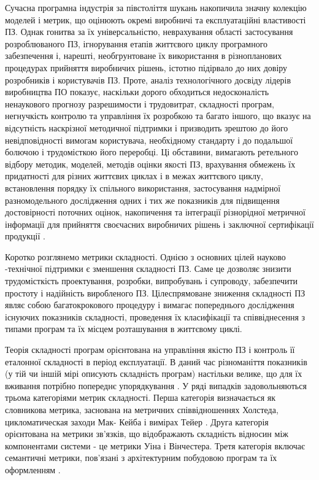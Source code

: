 Сучасна програмна індустрія за півстоліття шукань накопичила значну колекцію моделей і метрик, що оцінюють окремі виробничі та експлуатаційні властивості ПЗ. Однак гонитва за їх універсальністю, неврахування області застосування розроблюваного ПЗ, ігнорування етапів життєвого циклу програмного забезпечення і, нарешті, необгрунтоване їх використання в різнопланових процедурах прийняття виробничих рішень, істотно підірвало до них довіру розробників і користувачів ПЗ.
Проте, аналіз технологічного досвіду лідерів виробництва ПО показує, наскільки дорого обходиться недосконалість ненаукового прогнозу разрешимости і трудовитрат, складності програм, негнучкість контролю та управління їх розробкою та багато іншого, що вказує на відсутність наскрізної методичної підтримки і призводить зрештою до його невідповідності вимогам користувача, необхідному стандарту і до подальшої болючою і трудомісткою його переробці. Ці обставини, вимагають ретельного відбору методик, моделей, методів оцінки якості ПЗ, врахування обмежень їх придатності для різних життєвих циклах і в межах життєвого циклу, встановлення порядку їх спільного використання, застосування надмірної разномодельного дослідження одних і тих же показників для підвищення достовірності поточних оцінок, накопичення та інтеграції різнорідної метричної інформації для прийняття своєчасних виробничих рішень і заключної сертифікації продукції .

Коротко розглянемо метрики складності. Однією з основних цілей науково -технічної підтримки є зменшення складності ПЗ. Саме це дозволяє знизити трудомісткість проектування, розробки, випробувань і супроводу, забезпечити простоту і надійність виробленого ПЗ. Цілеспрямоване зниження складності ПЗ являє собою багатокрокового процедуру і вимагає попереднього дослідження існуючих показників складності, проведення їх класифікації та співвіднесення з типами програм та їх місцем розташування в життєвому циклі.

Теорія складності програм орієнтована на управління якістю ПЗ і контроль її еталонної складності в період експлуатації. В даний час різноманіття показників (у тій чи іншій мірі описують складність програм) настільки велике, що для їх вживання потрібно попереднє упорядкування . У ряді випадків задовольняються трьома категоріями метрик складності. Перша категорія визначається як словникова метрика, заснована на метричних співвідношеннях Холстеда, цикломатическая заходи Мак- Кейба і вимірах Тейер . Друга категорія орієнтована на метрики зв'язків, що відображають складність відносин між компонентами системи - це метрики Уіна і Вінчестера. Третя категорія включає семантичні метрики, пов'язані з архітектурним побудовою програм та їх оформленням .

